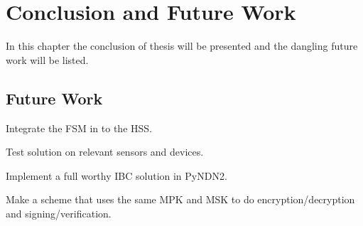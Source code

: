 \chapter{Conclusion and Future Work}\label{chp7:conclusion}
In this chapter the conclusion of thesis will be presented and the dangling future work will be listed.

\section{Future Work}
Integrate the \gls{FSM} in to the \gls{HSS}.

Test solution on relevant sensors and devices.

Implement a full worthy \gls{IBC} solution in \gls{PyNDN2}.

Make a scheme that uses the same \gls{MPK} and \gls{MSK} to do encryption/decryption and signing/verification. 
